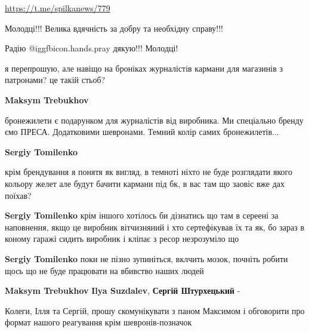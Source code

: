  
 
 
 
 
\zzSecCmt

\begin{itemize} %
\url{https://t.me/spilkanews/779}

Молодці!!! Велика вдячність за добру та необхідну справу!!!

Радію  @igg{fbicon.hands.pray}  дякую!!! Молодці!

я перепрошую, але навіщо на броніках журналістів кармани для магазинів з патронами? це такій стьоб?

\begin{itemize} %
\textbf{Maksym Trebukhov} 

бронежилети є подарунком для журналістів від виробника. Ми спеціально бренду
ємо ПРЕСА. Додатковими шевронами. Темний колір самих бронежилетів...

\textbf{Sergiy Tomilenko} 

крім брендування я понятя як вигляд, в темноті ніхто не буде розглядати якого
кольору желет але будут бачити кармани під бк, в вас там що заовіс вже дах
поїхав?

\textbf{Sergiy Tomilenko} крім іншого хотілось би дізнатись що там в сереені за наповнення, якщо це виробник вітчизняний і хто сертефікував їх та як, бо зараз в коному гаражі сидить виробник і кліпає з ресор незрозуміло що

\textbf{Sergiy Tomilenko} поки не пізно зупиніться, вклчить мозок, почніть робити щось що не буде працювати на вбивство наших людей

\textbf{Maksym Trebukhov} \textbf{Ilya Suzdalev}, \textbf{Сергій Штурхецький} - 

Колеги, Ілля та Сергій, прошу скомунікувати з паном Максимом і обговорити про
формат нашого реагування крім шевронів-позначок

\end{itemize} %

\end{itemize} %

